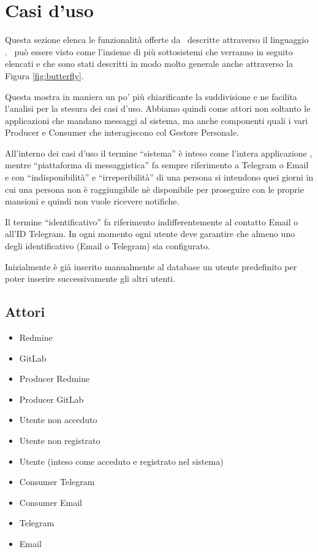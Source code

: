 \clearpage
\section{Casi d'uso}\label{CasiDUso}
Questa sezione elenca le funzionalità offerte da \progetto\ descritte attraverso il linguaggio .
\progetto\ può essere visto come l'insieme di più sottosistemi che verranno in seguito elencati e che sono stati descritti in modo molto generale anche attraverso la Figura \ref{fig:butterfly}.\par
Questa mostra in maniera un po' più chiarificante la suddivisione e ne facilita l'analisi per la stesura dei casi d'uso.
Abbiamo quindi come attori non soltanto le applicazioni che mandano messaggi al sistema, ma anche componenti quali i vari Producer e Consumer che interagiscono col Gestore Personale. \par
All'interno dei casi d'uso il termine ``sistema'' è inteso come l'intera applicazione \progetto, mentre ``piattaforma di messaggistica'' fa sempre riferimento a Telegram o Email e con ``indisponibilità'' e ``irreperibilità'' di una persona si intendono quei giorni in cui una persona non è raggiungibile nè disponibile per proseguire con le proprie mansioni e quindi non vuole ricevere notifiche. \par
Il termine ``identificativo'' fa riferimento indifferentemente al contatto Email o all'ID Telegram. In ogni momento ogni utente deve garantire che almeno uno degli identificativo (Email o Telegram) sia configurato. \par
Inizialmente è già inserito manualmente al database un utente predefinito per poter inserire successivamente gli altri utenti.

	\subsection{Attori}
	\begin{itemize}
		\item Redmine
		\item GitLab
		\item Producer Redmine
		\item Producer GitLab
		\item Utente non acceduto
		\item Utente non registrato
		\item Utente (inteso come acceduto e registrato nel sistema)
		\item Consumer Telegram
		\item Consumer Email
		\item Telegram
		\item Email
	\end{itemize}


